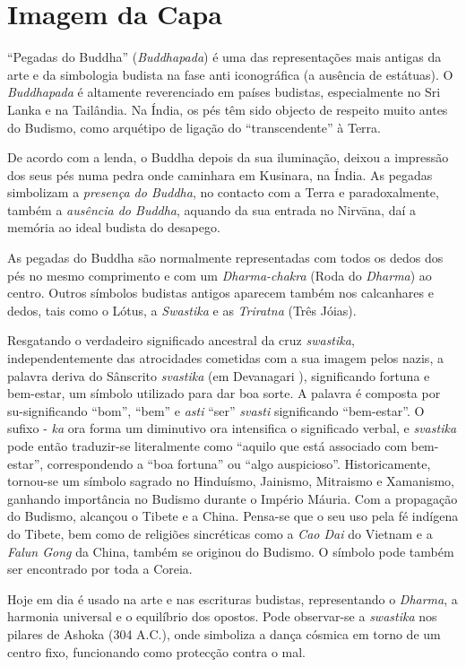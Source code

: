 \chapter{Imagem da Capa}

``Pegadas do Buddha'' (\emph{Buddhapada}) é uma das representações mais antigas
da arte e da simbologia budista na fase anti iconográfica (a ausência de
estátuas). O \emph{Buddhapada} é altamente reverenciado em países budistas,
especialmente no Sri Lanka e na Tailândia. Na Índia, os pés têm sido objecto de
respeito muito antes do Budismo, como arquétipo de ligação do ``transcendente''
à Terra.

De acordo com a lenda, o Buddha depois da sua iluminação, deixou a impressão dos
seus pés numa pedra onde caminhara em Kusinara, na Índia. As pegadas simbolizam
a \emph{presença do Buddha}, no contacto com a Terra e paradoxalmente, também a
\emph{ausência do Buddha}, aquando da sua entrada no Nirvāna, daí a memória ao
ideal budista do desapego.

As pegadas do Buddha são normalmente representadas com todos os dedos dos pés no
mesmo comprimento e com um \emph{Dharma-chakra} (Roda do \emph{Dharma}) ao
centro. Outros símbolos budistas antigos aparecem também nos calcanhares e
dedos, tais como o Lótus, a \emph{Swastika} e as \emph{Triratna} (Três Jóias).

Resgatando o verdadeiro significado ancestral da cruz \emph{swastika},
independentemente das atrocidades cometidas com a sua imagem pelos nazis, a
palavra deriva do Sânscrito \emph{svastika} (em Devanagari ),
significando fortuna e bem-estar, um símbolo utilizado para dar boa sorte. A
palavra é composta por su-significando ``bom'', ``bem'' e \emph{asti} ``ser''
\emph{svasti} significando ``bem-estar''. O sufixo - \emph{ka} ora forma um
diminutivo ora intensifica o significado verbal, e \emph{svastika} pode então
traduzir-se literalmente como ``aquilo que está associado com bem-estar'',
correspondendo a ``boa fortuna'' ou ``algo auspicioso''. Historicamente,
tornou-se um símbolo sagrado no Hinduísmo, Jainismo, Mitraismo e Xamanismo,
ganhando importância no Budismo durante o Império Máuria. Com a propagação do
Budismo, alcançou o Tibete e a China. Pensa-se que o seu uso pela fé indígena do
Tibete, bem como de religiões sincréticas como a \emph{Cao Dai} do Vietnam e a
\emph{Falun Gong} da China, também se originou do Budismo. O símbolo pode também
ser encontrado por toda a Coreia.

Hoje em dia é usado na arte e nas escrituras budistas, representando o
\emph{Dharma}, a harmonia universal e o equilíbrio dos opostos. Pode observar-se
a \emph{swastika} nos pilares de Ashoka (304 A.C.), onde simboliza a dança
cósmica em torno de um centro fixo, funcionando como protecção contra o mal.
